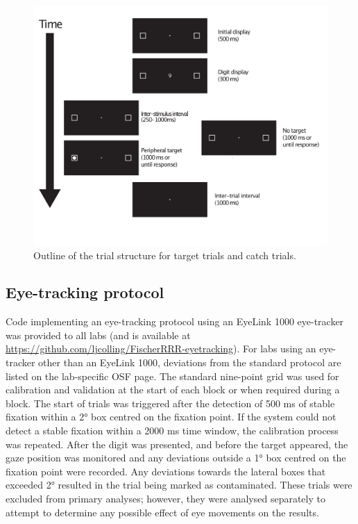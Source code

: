 \documentclass[A4paper,man,floatsintext]{apa6}
\theoremstyle{definition}
\theoremstyle{definition}
\theoremstyle{definition}
\theoremstyle{remark}
\begin{document}
\begin{figure}
\includegraphics[width=\textwidth]{trialstructure} \caption{Outline of the trial structure for target trials and catch
trials.}\label{fig:Trial}
\end{figure}

\subsection{Eye-tracking protocol}\label{eye-tracking-protocol}

Code implementing an eye-tracking protocol using an EyeLink 1000
eye-tracker was provided to all labs (and is available at
\url{https://github.com/ljcolling/FischerRRR-eyetracking}). For labs
using an eye-tracker other than an EyeLink 1000, deviations from the
standard protocol are listed on the lab-specific OSF page. The standard
nine-point grid was used for calibration and validation at the start of
each block or when required during a block. The start of trials was
triggered after the detection of 500 ms of stable fixation within a 2°
box centred on the fixation point. If the system could not detect a
stable fixation within a 2000 ms time window, the calibration process
was repeated. After the digit was presented, and before the target
appeared, the gaze position was monitored and any deviations outside a
1° box centred on the fixation point were recorded. Any deviations
towards the lateral boxes that exceeded 2° resulted in the trial being
marked as contaminated. These trials were excluded from primary
analyses; however, they were analysed separately to attempt to determine
any possible effect of eye movements on the results.
\end{document}
